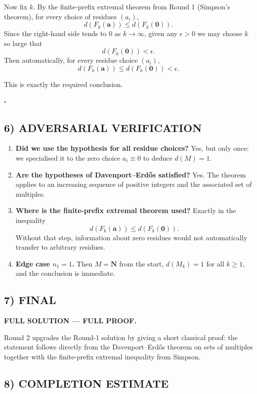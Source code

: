 Now fix $k$. By the finite-prefix extremal theorem from Round 1 (Simpson's theorem), for every choice of residues $(a_i)$,
\[
d(F_k(\mathbf a))\le d(F_k(\mathbf 0)).
\]
Since the right-hand side tends to $0$ as $k\to\infty$, given any $\epsilon>0$ we may choose $k$ so large that
\[
d(F_k(\mathbf 0))<\epsilon.
\]
Then automatically, for every residue choice $(a_i)$,
\[
d(F_k(\mathbf a))\le d(F_k(\mathbf 0))<\epsilon.
\]

This is exactly the required conclusion.

\hfill $\square$

\subsection*{6) ADVERSARIAL VERIFICATION}

\begin{enumerate}
\item \textbf{Did we use the hypothesis for all residue choices?} Yes, but only once: we specialised it to the zero choice $a_i\equiv 0$ to deduce $d(M)=1$.

\item \textbf{Are the hypotheses of Davenport--Erd\H{o}s satisfied?} Yes. The theorem applies to an increasing sequence of positive integers and the associated set of multiples.

\item \textbf{Where is the finite-prefix extremal theorem used?} Exactly in the inequality
\[
d(F_k(\mathbf a))\le d(F_k(\mathbf 0)).
\]
Without that step, information about zero residues would not automatically transfer to arbitrary residues.

\item \textbf{Edge case $n_1=1$.} Then $M=\mathbf N$ from the start, $d(M_k)=1$ for all $k\ge 1$, and the conclusion is immediate.
\end{enumerate}

\subsection*{7) FINAL}

\textbf{FULL SOLUTION --- FULL PROOF.}

Round 2 upgrades the Round-1 solution by giving a short classical proof: the statement follows directly from the Davenport--Erd\H{o}s theorem on sets of multiples together with the finite-prefix extremal inequality from Simpson.

\subsection*{8) COMPLETION ESTIMATE}

